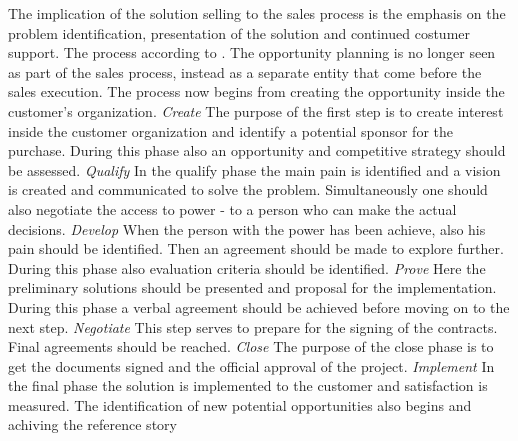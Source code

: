 \documentclass[12pt,a4paper,oneside,pdftex]{report}
\begin{document}
{{The implication of the solution selling to the sales process is the emphasis on the problem identification, presentation of the solution and continued costumer support. The process according to \citep{Eades}. The opportunity planning is no longer seen as part of the sales process, instead as a separate entity that come before the sales execution. The process now begins from creating the opportunity inside the customer's organization. \newline \newline\emph{Create}\newline 
The purpose of the first step is to create interest inside the customer organization and identify a potential sponsor for the purchase. During this phase also an opportunity and competitive strategy should be assessed. \citep{Eades}\newline \newline
\emph{Qualify}\newline 
In the qualify phase the main pain is identified and a vision is created and communicated to solve the problem. Simultaneously one should also negotiate the access to power - to a person who can make the actual decisions. 
 \citep{Eades}\newline \newline
\emph{Develop}\newline
When the person with the power has been achieve, also his pain should be identified. Then an agreement should be made to explore further. During this phase also evaluation criteria should be identified. 
\citep{Eades} \newline \newline
\emph{Prove}\newline
Here the preliminary solutions should be presented and proposal for the implementation. During this phase a verbal agreement should be achieved before moving on to the next step.  \citep{Eades}\newline \newline
\emph{Negotiate}\newline
This step serves to prepare for the signing of the contracts. Final agreements should be reached. \citep{Eades}\newline \newline
\emph{Close}\newline
The purpose of the close phase is to get the documents signed and the official approval of the project. \citep{Eades} \newline \newline
\emph{Implement}\newline
In the final phase the solution is implemented to the customer and satisfaction is measured. The identification of new potential opportunities also begins and achiving the reference story \citep{Eades}
\newline


}}
\end{document}

